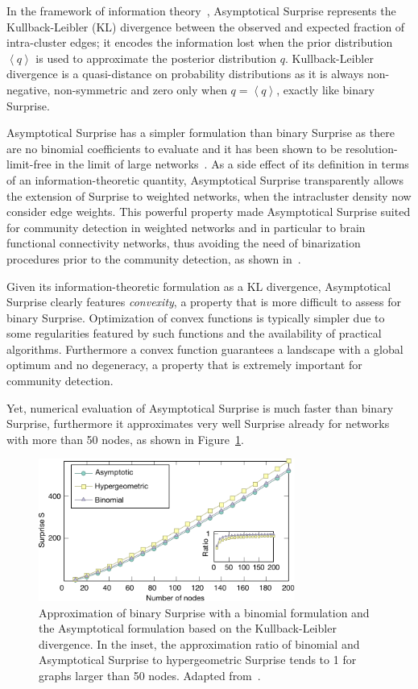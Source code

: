 In the framework of information theory~\cite{cover2006}, Asymptotical Surprise represents the Kullback-Leibler (KL) divergence between the observed and expected fraction of intra-cluster edges; it encodes the information lost when the prior distribution $\left <q \right >$ is used to approximate the posterior distribution $q$.
Kullback-Leibler divergence is a quasi-distance on probability distributions as it is always non-negative, non-symmetric and zero only when $q=\left< q \right>$, exactly like binary Surprise.

Asymptotical Surprise has a simpler formulation than binary Surprise as there are no binomial coefficients to evaluate and it has been shown to be resolution-limit-free in the limit of large networks~\cite{traag2015}.
As a side effect of its definition in terms of an information-theoretic quantity, Asymptotical Surprise transparently allows the extension of Surprise to weighted networks, when the intracluster density now consider edge weights.
This powerful property made Asymptotical Surprise suited for community detection in weighted networks and in particular to brain functional connectivity networks, thus avoiding the need of binarization procedures prior to the community detection, as shown in~\cite{nicolini2017}.

Given its information-theoretic formulation as a KL divergence, Asymptotical Surprise clearly features \emph{convexity}, a property that is more difficult to assess for binary Surprise.
Optimization of convex functions is typically simpler due to some regularities featured by such functions and the availability of practical algorithms.
Furthermore a convex function guarantees a landscape with a global optimum and no degeneracy, a property that is extremely important for community detection.

Yet, numerical evaluation of Asymptotical Surprise is much faster than binary Surprise, furthermore it approximates very well Surprise already for networks with more than 50 nodes, as shown in Figure~\ref{fig:asymptotical_surprise_comparison}.

\begin{figure}[!htb]
\centering
\includegraphics[width=0.75\textwidth]{images/asymptotical_surprise_comparison.pdf}
\caption{Approximation of binary Surprise with a binomial formulation and the Asymptotical formulation based on the Kullback-Leibler divergence.
In the inset, the approximation ratio of binomial and Asymptotical Surprise to hypergeometric Surprise tends to 1 for graphs larger than 50 nodes.
Adapted from~\cite{traag2015}.}
\label{fig:asymptotical_surprise_comparison}
\end{figure}

